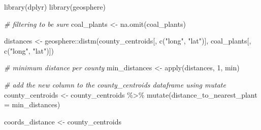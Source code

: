 \documentclass[
]{article}
\newenvironment{Shaded}{\begin{snugshade}}{\end{snugshade}}
\newcommand{\AttributeTok}[1]{\textcolor[rgb]{0.77,0.63,0.00}{#1}}
\newcommand{\CommentTok}[1]{\textcolor[rgb]{0.56,0.35,0.01}{\textit{#1}}}
\newcommand{\DecValTok}[1]{\textcolor[rgb]{0.00,0.00,0.81}{#1}}
\newcommand{\FunctionTok}[1]{\textcolor[rgb]{0.00,0.00,0.00}{#1}}
\newcommand{\NormalTok}[1]{#1}
\newcommand{\OtherTok}[1]{\textcolor[rgb]{0.56,0.35,0.01}{#1}}
\newcommand{\SpecialCharTok}[1]{\textcolor[rgb]{0.00,0.00,0.00}{#1}}
\newcommand{\StringTok}[1]{\textcolor[rgb]{0.31,0.60,0.02}{#1}}
\begin{document}
\begin{Shaded}
\begin{Highlighting}[]
\FunctionTok{library}\NormalTok{(dplyr)}
\FunctionTok{library}\NormalTok{(geosphere)}

\CommentTok{\# filtering to be sure}
\NormalTok{coal\_plants }\OtherTok{\textless{}{-}} \FunctionTok{na.omit}\NormalTok{(coal\_plants)}

\NormalTok{distances }\OtherTok{\textless{}{-}}\NormalTok{ geosphere}\SpecialCharTok{::}\FunctionTok{distm}\NormalTok{(county\_centroids[, }\FunctionTok{c}\NormalTok{(}\StringTok{"long"}\NormalTok{, }\StringTok{"lat"}\NormalTok{)], coal\_plants[, }\FunctionTok{c}\NormalTok{(}\StringTok{"long"}\NormalTok{, }\StringTok{"lat"}\NormalTok{)])}

\CommentTok{\# minimum distance per county}
\NormalTok{min\_distances }\OtherTok{\textless{}{-}} \FunctionTok{apply}\NormalTok{(distances, }\DecValTok{1}\NormalTok{, min)}

\CommentTok{\# add the new column to the county\_centroids dataframe using mutate}
\NormalTok{county\_centroids }\OtherTok{\textless{}{-}}\NormalTok{ county\_centroids }\SpecialCharTok{\%\textgreater{}\%} 
  \FunctionTok{mutate}\NormalTok{(}\AttributeTok{distance\_to\_nearest\_plant =}\NormalTok{ min\_distances)}

\NormalTok{coords\_distance }\OtherTok{\textless{}{-}}\NormalTok{ county\_centroids}
\end{Highlighting}
\end{Shaded}
\end{document}
